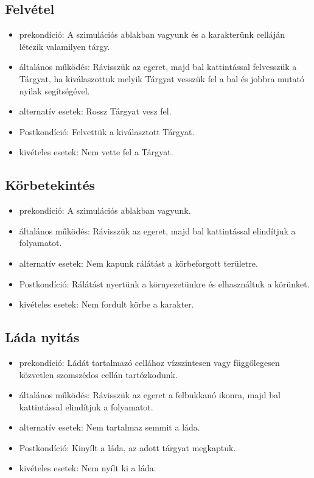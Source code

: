 \subsection{Felvétel}

\begin{itemize}
    \item prekondíció: A szimulációs ablakban vagyunk és a karakterünk celláján létezik valamilyen tárgy.
    \item általános működés: Rávisszük az egeret, majd bal kattintással felvesszük a Tárgyat, ha kiválaszottuk melyik Tárgyat vesszük fel a bal és jobbra mutató nyilak segítségével.
    \item alternatív esetek: Rossz Tárgyat vesz fel.
    \item Postkondíció: Felvettük a kiválasztott Tárgyat.
    \item kivételes esetek: Nem vette fel a Tárgyat.
\end{itemize}

\subsection{Körbetekintés}

\begin{itemize}
    \item prekondíció: A szimulációs ablakban vagyunk.
    \item általános működés: Rávisszük az egeret, majd bal kattintással elindítjuk a folyamatot.
    \item alternatív esetek: Nem kapunk rálátást a körbeforgott területre.
    \item Postkondíció: Rálátást nyertünk a környezetünkre és elhasználtuk a körünket.
    \item kivételes esetek: Nem fordult körbe a karakter.
\end{itemize}

\subsection{Láda nyitás}

\begin{itemize}
    \item prekondíció: Ládát tartalmazó cellához vízszintesen vagy függőlegesen közvetlen szomszédos cellán tartózkodunk.
    \item általános működés: Rávisszük az egeret a felbukkanó ikonra, majd bal kattintással elindítjuk a folyamatot.
    \item alternatív esetek: Nem tartalmaz semmit a láda.
    \item Postkondíció: Kinyílt a láda, az adott tárgyat megkaptuk.
    \item kivételes esetek: Nem nyílt ki a láda.
\end{itemize}